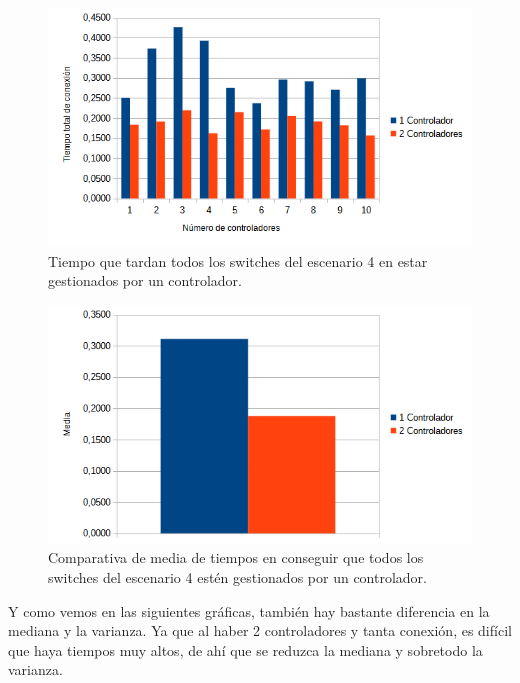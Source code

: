 \documentclass[a4paper, 12pt]{book}
\begin{document}
		
	
	
	\begin{figure}[H]
		\centering
		\includegraphics[width=13cm, keepaspectratio]{img/comparativaescenario4}
		\caption{Tiempo que tardan todos los switches del escenario 4 en estar gestionados por un controlador.}
		\label{figura:comparativaescenario4}
	\end{figure}
	
	\begin{figure}[H]
		\centering
		\includegraphics[width=13cm, keepaspectratio]{img/comparativamediaescenario4}
		\caption{Comparativa de media de tiempos en conseguir que todos los switches del escenario 4 estén gestionados por un controlador.}
		\label{figura:mediaescenario4}
	\end{figure}
	

	Y como vemos en las siguientes gráficas, también hay bastante diferencia en la mediana y la varianza. Ya que al haber 2 controladores y tanta conexión, es difícil que haya tiempos muy altos, de ahí que se reduzca la mediana y sobretodo la varianza.
	
\end{document}

